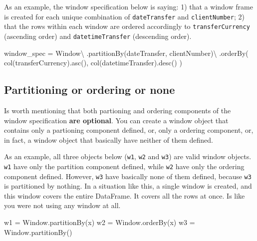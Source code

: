 \documentclass[
  11pt,
  letterpaper,
  DIV=11,
  numbers=noendperiod]{scrreprt}
\newenvironment{Shaded}{\begin{snugshade}}{\end{snugshade}}
\newcommand{\NormalTok}[1]{\textcolor[rgb]{0.00,0.23,0.31}{#1}}
\newcommand{\OperatorTok}[1]{\textcolor[rgb]{0.37,0.37,0.37}{#1}}
\newcommand{\StringTok}[1]{\textcolor[rgb]{0.13,0.47,0.30}{#1}}
\begin{document}
As an example, the window specification below is saying: 1) that a
window frame is created for each unique combination of
\texttt{dateTransfer} and \texttt{clientNumber}; 2) that the rows within
each window are ordered accordingly to \texttt{transferCurrency}
(ascending order) and \texttt{datetimeTransfer} (descending order).

\begin{Shaded}
\begin{Highlighting}[]
\NormalTok{window\_spec }\OperatorTok{=}\NormalTok{ Window}\OperatorTok{\textbackslash{}}
\NormalTok{    .partitionBy(}\StringTok{\textquotesingle{}dateTransfer\textquotesingle{}}\NormalTok{, }\StringTok{\textquotesingle{}clientNumber\textquotesingle{}}\NormalTok{)}\OperatorTok{\textbackslash{}}
\NormalTok{    .orderBy(}
\NormalTok{        col(}\StringTok{\textquotesingle{}transferCurrency\textquotesingle{}}\NormalTok{).asc(),}
\NormalTok{        col(}\StringTok{\textquotesingle{}datetimeTransfer\textquotesingle{}}\NormalTok{).desc()}
\NormalTok{    )}
\end{Highlighting}
\end{Shaded}

\hypertarget{partitioning-or-ordering-or-none}{%
\subsection{Partitioning or ordering or
none}\label{partitioning-or-ordering-or-none}}

Is worth mentioning that both partioning and ordering components of the
window specification \textbf{are optional}. You can create a window
object that contains only a partioning component defined, or, only a
ordering component, or, in fact, a window object that basically have
neither of them defined.

As an example, all three objects below (\texttt{w1}, \texttt{w2} and
\texttt{w3}) are valid window objects. \texttt{w1} have only the
partition component defined, while \texttt{w2} have only the ordering
component defined. However, \texttt{w3} have basically none of them
defined, because \texttt{w3} is partitioned by nothing. In a situation
like this, a single window is created, and this window covers the entire
DataFrame. It covers all the rows at once. Is like you were not using
any window at all.

\begin{Shaded}
\begin{Highlighting}[]
\NormalTok{w1 }\OperatorTok{=}\NormalTok{ Window.partitionBy(}\StringTok{\textquotesingle{}x\textquotesingle{}}\NormalTok{)}
\NormalTok{w2 }\OperatorTok{=}\NormalTok{ Window.orderBy(}\StringTok{\textquotesingle{}x\textquotesingle{}}\NormalTok{)}
\NormalTok{w3 }\OperatorTok{=}\NormalTok{ Window.partitionBy()}
\end{Highlighting}
\end{Shaded}
\end{document}
